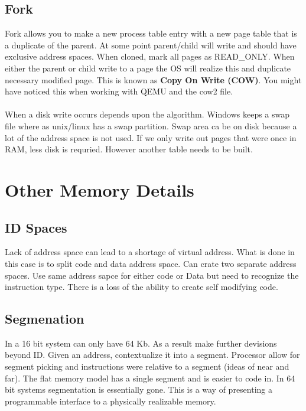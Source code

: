 \documentclass[../base_file/cs1550_notes.tex]{subfiles}
\begin{document}
\subsection{Fork}
Fork allows you to make a new process table entry with a new page table that is a duplicate of the parent.  At some point parent/child will
write and should have exclusive address spaces.  When cloned, mark all pages as READ\_ONLY.  When either the parent or child write to a page
the OS will realize this and duplicate necessary modified page.  This is known as \textbf{Copy On Write (COW)}.  You might have noticed this
when working with QEMU and the cow2 file.\\\\
When a disk write occurs depends upon the algorithm.  Windows keeps a swap file where as unix/linux has a swap partition.  Swap area ca be
on disk because a lot of the address space is not used.  If we only write out pages that were once in RAM, less disk is requried.  However
another table needs to be built.
\section{Other Memory Details}
\subsection{ID Spaces}
Lack of address space can lead to a shortage of virtual address.  What is done in this case is to split code and data address space.  Can
crate two separate address spaces.  Use same address sapce for either code or Data but need to recognize the instruction type.  There is a 
loss of the ability to create self modifying code.
\subsection{Segmenation}
In a 16 bit system can only have 64 Kb. As a result make further devisions beyond ID.  Given an address, contextualize it into a segment.
Processor allow for segment picking and instructions were relative to a segment (ideas of near and far).  The flat memory model has a single
segment and is easier to code in.  In 64 bit systems segmentation is essentially gone.  This is a way of presenting a programmable interface
to a physically realizable memory.
\end{document}
